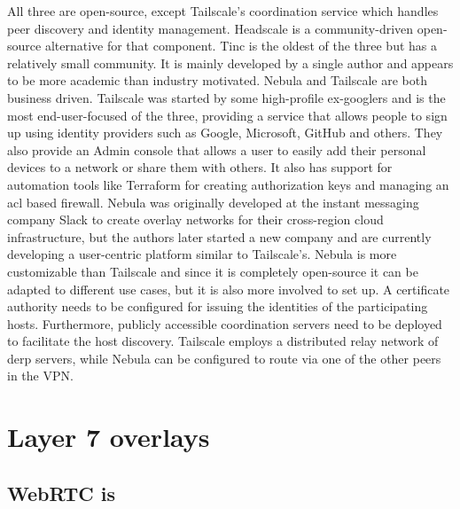All three are open-source, except Tailscale's coordination service which
handles peer discovery and identity management. Headscale
\autocite{fontJuanfontHeadscale2022} is a community-driven open-source
alternative for that component. Tinc is the oldest of the three but has
a relatively small community. It is mainly developed by a single author
and appears to be more academic than industry motivated. Nebula and
Tailscale are both business driven. Tailscale was started by some
high-profile ex-googlers and is the most end-user-focused of the three,
providing a service that allows people to sign up using identity
providers such as Google, Microsoft, GitHub and others. They also
provide an Admin console that allows a user to easily add their personal
devices to a network or share them with others. It also has support for
automation tools like Terraform for creating authorization keys and
managing an \gls{acl} based firewall. Nebula was originally developed at
the instant messaging company Slack to create overlay networks for their
cross-region cloud infrastructure, but the authors later started a new
company and are currently developing a user-centric platform similar to
Tailscale's. Nebula is more customizable than Tailscale and since it is
completely open-source it can be adapted to different use cases, but it
is also more involved to set up. A certificate authority needs to be
configured for issuing the identities of the participating hosts.
Furthermore, publicly accessible coordination servers need to be
deployed to facilitate the host discovery. Tailscale employs a
distributed relay network of \gls{derp} servers, while Nebula can be
configured to route via one of the other peers in the VPN.

\hypertarget{layer-7-overlays}{%
\section{Layer 7 overlays}\label{layer-7-overlays}}

\hypertarget{webrtc-is}{%
\subsection{WebRTC is}\label{webrtc-is}}

